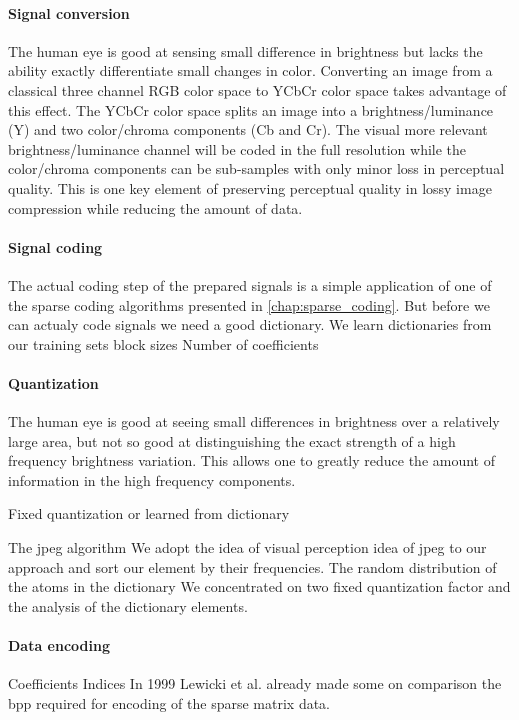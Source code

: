 \paragraph{Signal conversion}
The human eye is good at sensing small difference in brightness but lacks the
ability exactly differentiate small changes in color. Converting an image from a
classical three channel RGB color space to YCbCr color space takes advantage of
this effect. The YCbCr color space splits an image
into a brightness/luminance (Y) and two color/chroma components (Cb
and Cr). The visual more relevant brightness/luminance channel will be coded
in the full resolution while the color/chroma components can be sub-samples
with only minor loss in perceptual quality. This is one key element of
preserving perceptual quality in lossy image compression while reducing the
amount of data.

\paragraph{Signal coding}
The actual coding step of the prepared signals is a simple application of one
of the sparse coding algorithms presented in \ref{chap:sparse_coding}.
But before we can actualy code signals we need a good dictionary.
We learn dictionaries from our training sets 
block sizes
Number of coefficients


\paragraph{Quantization}
The human eye is good at seeing small differences in brightness over a
relatively large area, but not so good at distinguishing the exact strength of a
high frequency brightness variation. This allows one to greatly reduce the
amount of information in the high frequency components. 

Fixed quantization or learned from dictionary

The jpeg algorithm 
We adopt the idea of visual perception idea of jpeg to our
approach and sort our element by their frequencies.
The random distribution of the atoms in the dictionary 
We concentrated on two fixed quantization factor and the analysis of the
dictionary elements.



\paragraph{Data encoding}
Coefficients
Indices
In 1999 Lewicki et al.\cite{Lewicki1999} already made some on comparison 
the bpp required for encoding of the sparse matrix data.
\cite{Murray2006}

